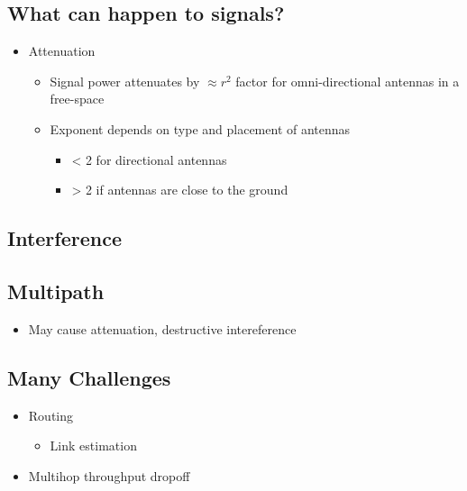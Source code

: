 \subsection{What can happen to signals?}
\begin{itemize}[nosep]
    \item Attenuation
          \begin{itemize}[nosep]
              \item Signal power attenuates by $\approx r^2$ factor for omni-directional antennas in a free-space
              \item Exponent depends on type and placement of antennas
                    \begin{itemize}[nosep]
                        \item < 2 for directional antennas
                        \item > 2 if antennas are close to the ground
                    \end{itemize}
          \end{itemize}
\end{itemize}

\subsection{Interference}
\subsection{Multipath}
\begin{itemize}[nosep]
    \item May cause attenuation, destructive intereference
\end{itemize}
\subsection{Many Challenges}
\begin{itemize}[nosep]
    \item Routing
          \begin{itemize}[nosep]
              \item Link estimation
          \end{itemize}
    \item Multihop throughput dropoff
\end{itemize}

